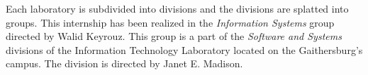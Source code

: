 Each laboratory is subdivided into divisions and the divisions are splatted into
groups. This internship has been realized in the \textit{Information Systems}
group directed by Walid Keyrouz. This group is a part of the \textit{Software
and Systems} divisions of the Information Technology Laboratory located on the
Gaithersburg's campus. The division is directed by Janet E. Madison.

